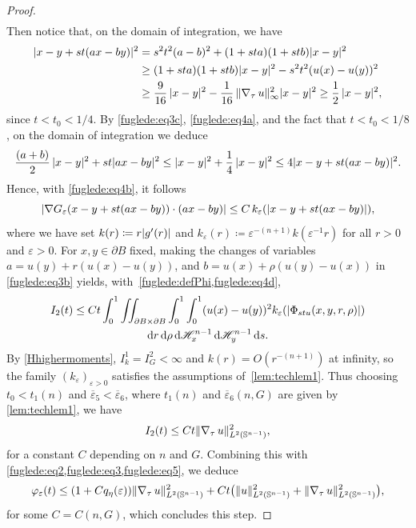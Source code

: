 \documentclass[JEP,XML,SOM,Unicode,published]{cedram}
\numberwithin{equation}{section}
\theoremstyle{plain}
\theoremstyle{definition}
\newcommand{\dd}{\mathop{}\mathopen{}\mathrm{d}}
\newcommand{\dr}{\mathop{}\mathopen{}\mathrm{d}r}
\newcommand{\ds}{\mathop{}\mathopen{}\mathrm{d}s}
\newcommand{\dH}{\mathop{}\mathopen{}\mathrm{d}\mathscr{H}}
\newcommand{\bbS}{\mathbb{S}}
\let\eps\varepsilon
\let\vphi\varphi
\let\ol\overline
\newcommand{\grad}{\nabla}
\DeclarePairedDelimiter{\abs}{\lvert}{\rvert}
\DeclarePairedDelimiter{\norm}{\lVert}{\rVert}
\begin{document}
\begin{proof}
\begin{multline}
\end{multline}
Then notice that, on the domain of integration, we have
\begin{equation}\label{fuglede:eq4a}
\begin{aligned}
\abs{x-y+st(ax-by)}^2
&=s^2t^2(a-b)^2+(1+sta)(1+stb)\abs{x-y}^2\\
&\geq (1+sta)(1+stb)\abs{x-y}^2-s^2t^2(u(x)-u(y))^2\\
&\geq \frac{9}{16}\,\abs{x-y}^2-\frac{1}{16}\,\norm{\grad_\tau\, u}_\infty^2\abs{x-y}^2
\geq \frac{1}{2}\,\abs{x-y}^2,
\end{aligned}
\end{equation}
since $t<t_0<1/4$.
By \cref{fuglede:eq3c}, \cref{fuglede:eq4a}, and the fact that $t<t_0<1/8$, on the domain of
integration we deduce
\[
\frac{(a+b)}{2}\,\abs{x-y}^2+st\abs{ax-by}^2
\leq \abs{x-y}^2+\frac{1}{4}\,\abs{x-y}^2
\leq 4\abs{x-y+st(ax-by)}^2.
\]
Hence, with \cref{fuglede:eq4b}, it follows
\begin{equation}\label{fuglede:eq4d}
\abs{\grad G_\eps(x-y+st(ax-by))\cdot(ax-by)} \leq C\, k_\eps(\abs{x-y+st(ax-by)}),
\end{equation}
where we have set $k(r)\coloneqq r\abs{g'(r)}$ and $k_\eps(r)\coloneqq
\eps^{-(n+1)}k(\eps^{-1}r)$ for all $r>0$ and $\eps>0$.
For $x,y\in\partial B$ fixed, making the changes of variables $a=u(y)+r(u(x)-u(y))$, and
$b=u(x)+\rho(u(y)-u(x))$ in \cref{fuglede:eq3b} yields, with~\cref{fuglede:defPhi,fuglede:eq4d},
\begin{multline*}
I_2(t)
\leq Ct \int_0^1 \iint_{\partial B\times\partial B}\int_0^1\int_0^1 (u(x)-u(y))^2
k_\eps(\abs{\Phi_{stu}(x,y,r,\rho)})\\\dr\dd\rho\dH^{n-1}_x\dH^{n-1}_y\ds.
\end{multline*}
By \cref{Hhighermoments}, $I_{k}^1=I_G^2<\infty$ and $k(r)=O(r^{-(n+1)})$ at infinity, so the family
$(k_\eps)_{\eps>0}$ satisfies the assumptions of~\cref{lem:techlem1}. Thus choosing $t_0<t_1(n)$ and
$\ol{\eps}_5<\ol{\eps}_6$, where $t_1(n)$ and $\ol{\eps}_6(n,G)$ are given by \cref{lem:techlem1},
we have
\[
I_2(t)
\leq Ct\norm{\grad_\tau\, u}^2_{L^2(\bbS^{n-1})},
\]
for a constant $C$ depending on $n$ and $G$.
Combining this with \cref{fuglede:eq2,fuglede:eq3,fuglede:eq5}, we deduce%
\begin{equation}\label{fuglede:eq7}
\vphi_\eps(t)
\leq (1+Cq_\eta(\eps))\norm{\grad_\tau\,u}_{L^2(\bbS^{n-1})}^2
+Ct\bigl(\norm{u}_{L^2(\bbS^{n-1})}^2+ \norm{\grad_\tau\,u}_{L^2(\bbS^{n-1})}^2\bigr),
\end{equation}
for some $C=C(n,G)$, which concludes this step.


\end{proof}
\end{document}
